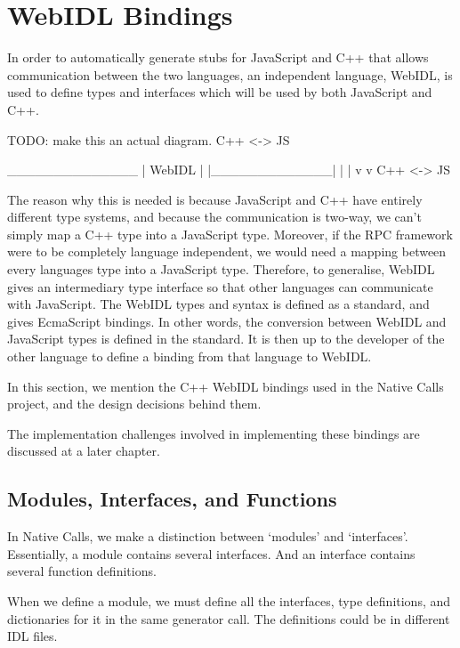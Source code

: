 \section{WebIDL Bindings} %
\label{sec:webidl_bindings}

In order to automatically generate stubs for JavaScript and C++ that allows communication between the two languages, an independent language, WebIDL, is used to define types and interfaces which will be used by both JavaScript and C++.

\begin{code}
TODO: make this an actual diagram.
C++   <->   JS

______________
|    WebIDL   |
|_____________|
  |         |
  v         v
 C++  <->  JS
\end{code}

The reason why this is needed is because JavaScript and C++ have entirely different type systems, and because the communication is two-way, we can't simply map a C++ type into a JavaScript type. Moreover, if the RPC framework were to be completely language independent, we would need a mapping between every languages type into a JavaScript type. Therefore, to generalise, WebIDL gives an intermediary type interface so that other languages can communicate with JavaScript. The WebIDL types and syntax is defined as a standard, and gives EcmaScript bindings. In other words, the conversion between WebIDL and JavaScript types is defined in the standard. It is then up to the developer of the other language to define a binding from that language to WebIDL.

In this section, we mention the C++ WebIDL bindings used in the Native Calls project, and the design decisions behind them.

The implementation challenges involved in implementing these bindings are discussed at a later chapter.

\subsection{Modules, Interfaces, and Functions} %
\label{sub:modules_and_interfaces}
In Native Calls, we make a distinction between `modules' and `interfaces'. Essentially, a module contains several interfaces. And an interface contains several function definitions.

When we define a module, we must define all the interfaces, type definitions, and dictionaries for it in the same generator call. The definitions could be in different IDL files.

